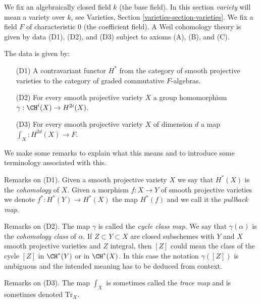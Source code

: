 \medskip\noindent
We fix an algebraically closed field $k$ (the base field).
In this section {\it variety} will mean a variety over $k$, see
Varieties, Section \ref{varieties-section-varieties}.
We fix a field $F$ of characteristic $0$ (the coefficient field).
A Weil cohomology theory is given by data (D1), (D2), and (D3)
subject to axioms (A), (B), and (C).

\medskip\noindent
The data is given by:
\begin{enumerate}
\item[(D1)] A contravariant functor $H^*$ from the category
of smooth projective varieties to the category of
graded commutative $F$-algebras.
\item[(D2)] For every smooth projective variety $X$
a group homomorphism $\gamma : \CH^i(X) \to H^{2i}(X)$.
\item[(D3)] For every smooth projective variety $X$ of dimension $d$
a map $\int_X : H^{2d}(X) \to F$.
\end{enumerate}
We make some remarks to explain what this means and to introduce
some terminology associated with this.

\medskip\noindent
Remarks on (D1). Given a smooth projective variety $X$
we say that $H^*(X)$ is the {\it cohomology} of $X$. Given a morphism
$f : X \to Y$ of smooth projective varieties we denote
$f^* : H^*(Y) \to H^*(X)$ the map $H^*(f)$ and we call it the
{\it pullback map}.

\medskip\noindent
Remarks on (D2). The map $\gamma$ is called the {\it cycle class map}.
We say that $\gamma(\alpha)$ is the {\it cohomology class} of $\alpha$.
If $Z \subset Y \subset X$ are closed subschemes with $Y$ and $X$
smooth projective varieties and $Z$ integral, then $[Z]$ could
mean the class of the cycle $[Z]$ in $\CH^*(Y)$ or in $\CH^*(X)$.
In this case the notation $\gamma([Z])$ is ambiguous and the intended meaning
has to be deduced from context.

\medskip\noindent
Remarks on (D3). The map $\int_X$ is sometimes called the
{\it trace map} and is sometimes denoted $\text{Tr}_X$.

